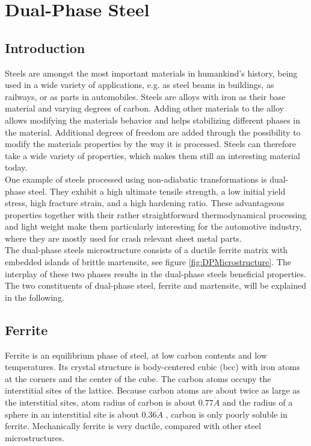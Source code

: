 \chapter{Dual-Phase Steel}
\label{cha:DualPhaseSteels}

\section{Introduction}

Steels are amongst the most important materials in humankind's history, being used in a wide variety of applications, e.g. as steel beams in buildings, as railways, or as parts in automobiles. Steels are alloys with iron as their base material and varying degrees of carbon. Adding other materials to the alloy allows modifying the materials behavior and helps stabilizing different phases in the material. Additional degrees of freedom are added through the possibility to modify the materials properties by the way it is processed. Steels can therefore take a wide variety of properties, which makes them still an interesting material today. \\


One example of steels processed using non-adiabatic transformations is dual-phase steel. They exhibit a high ultimate tensile strength, a low initial yield stress, high fracture strain, and a high hardening ratio. These advantageous properties together with their rather straightforward thermodynamical processing and light weight make them particularly interesting for the automotive industry, where they are mostly used for crash relevant sheet metal parts. \\

The dual-phase steels microstructure consists of a ductile ferrite matrix with embedded islands of brittle martensite, see figure \ref{fig:DPMicrostructure}. The interplay of these two phases results in the dual-phase steels beneficial properties. The two constituents of dual-phase steel, ferrite and martensite, will be explained in the following. \\

\section{Ferrite}

Ferrite is an equilibrium phase of steel, at low carbon contents and low temperatures. Its crystal structure is body-centered cubic (bcc) with iron atoms at the corners and the center of the cube. The carbon atoms occupy the interstitial sites of the lattice. Because carbon atoms are about twice as large as the interstitial sites, atom radius of carbon is about $0.77  \mathring{A}$ and the radius of a sphere in an interstitial site is about $0.36 \mathring{A}$ \cite{Bleck}, carbon is only poorly soluble in ferrite. Mechanically ferrite is very ductile, compared with other steel microstructures.  \\

